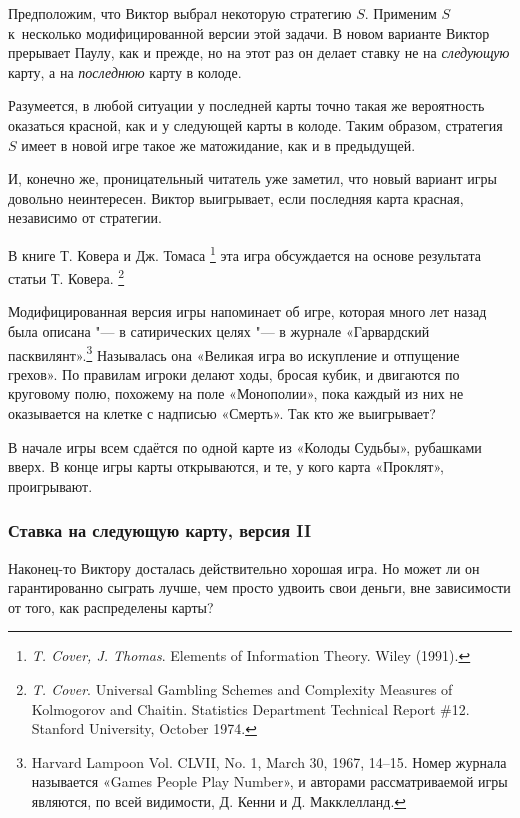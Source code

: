 \documentclass[twoside]{book}
\begin{document}
Предположим, что Виктор выбрал некоторую стратегию $S$.
Применим $S$ к~несколько модифицированной версии этой задачи.
В новом варианте Виктор прерывает Паулу, как и прежде, но на этот раз он делает ставку не на \emph{следующую} карту, а на \emph{последнюю} карту в колоде.

Разумеется, в любой ситуации у последней карты точно такая же вероятность оказаться красной, как и у следующей карты в колоде.
Таким образом, стратегия $S$ имеет в новой игре такое же матожидание, как и в предыдущей.

И, конечно же, проницательный читатель уже заметил, что новый вариант игры довольно неинтересен.
Виктор выигрывает, если последняя карта красная, независимо от стратегии.
\heart

В книге Т. Ковера и Дж. Томаса%
\footnote{\emph{T. Cover, J. Thomas}. {Elements of Information Theory}. Wiley (1991).} 
эта игра обсуждается на основе результата статьи Т. Ковера.%
\footnote{\emph{T. Cover}. Universal Gambling Schemes and Complexity Measures of Kolmogorov and Chaitin. {Statistics Department Technical Report \#12}. Stanford University, October 1974.}

Модифицированная версия игры %
напоминает об игре, которая много лет назад была описана "--- в сатирических целях "--- в журнале «Гарвардский пасквилянт».\footnote{Harvard Lampoon Vol. CLVII, No. 1, March 30, 1967, 14--15.
Номер журнала называется «Games People Play Number», и авторами рассматриваемой игры являются, по всей видимости, Д. Кенни и Д. Макклелланд.%
}
Называлась она «Великая игра во искупление и отпущение грехов».
По правилам игроки делают ходы, бросая кубик, и двигаются по круговому полю, похожему на поле «Монополии», пока каждый из них не оказывается на клетке с надписью «Смерть».
Так кто же выигрывает?

В начале игры всем сдаётся по одной карте из «Колоды Судьбы», рубашками вверх.
В конце игры карты открываются, и те, у кого карта «Проклят», проигрывают.

\subsubsection*{Ставка на следующую карту, версия II}%

Наконец-то Виктору досталась действительно хорошая игра.
Но может ли он гарантированно сыграть лучше, чем просто удвоить свои деньги, вне зависимости от того, как распределены карты?
\end{document}
